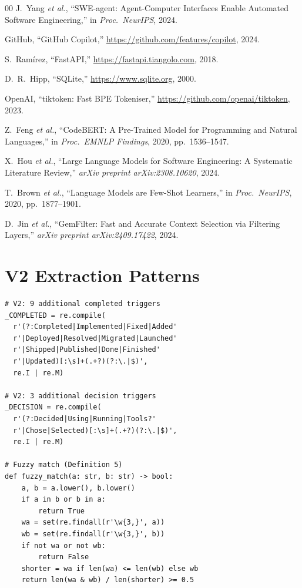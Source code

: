 \documentclass[journal]{IEEEtran}
\begin{document}
\begin{thebibliography}{00}
J.~Yang \emph{et al.}, ``SWE-agent: Agent-Computer Interfaces
Enable Automated Software Engineering,'' in \emph{Proc.\
NeurIPS}, 2024.

GitHub, ``GitHub Copilot,''
\url{https://github.com/features/copilot}, 2024.

S.~Ram\'irez, ``FastAPI,''
\url{https://fastapi.tiangolo.com}, 2018.

D.~R.~Hipp, ``SQLite,''
\url{https://www.sqlite.org}, 2000.

OpenAI, ``tiktoken: Fast BPE Tokeniser,''
\url{https://github.com/openai/tiktoken}, 2023.

Z.~Feng \emph{et al.}, ``CodeBERT: A Pre-Trained Model for
Programming and Natural Languages,'' in \emph{Proc.\ EMNLP
Findings}, 2020, pp.\ 1536--1547.

X.~Hou \emph{et al.}, ``Large Language Models for Software
Engineering: A Systematic Literature Review,''
\emph{arXiv preprint arXiv:2308.10620}, 2024.

T.~Brown \emph{et al.}, ``Language Models are Few-Shot
Learners,'' in \emph{Proc.\ NeurIPS}, 2020,
pp.\ 1877--1901.

D.~Jin \emph{et al.}, ``GemFilter: Fast and Accurate
Context Selection via Filtering Layers,''
\emph{arXiv preprint arXiv:2409.17422}, 2024.

\end{thebibliography}

\appendix

\section{V2 Extraction Patterns}
\label{appendix:regex}

\begin{small}
\begin{verbatim}
# V2: 9 additional completed triggers
_COMPLETED = re.compile(
  r'(?:Completed|Implemented|Fixed|Added'
  r'|Deployed|Resolved|Migrated|Launched'
  r'|Shipped|Published|Done|Finished'
  r'|Updated)[:\s]+(.+?)(?:\.|$)',
  re.I | re.M)

# V2: 3 additional decision triggers
_DECISION = re.compile(
  r'(?:Decided|Using|Running|Tools?'
  r'|Chose|Selected)[:\s]+(.+?)(?:\.|$)',
  re.I | re.M)

# Fuzzy match (Definition 5)
def fuzzy_match(a: str, b: str) -> bool:
    a, b = a.lower(), b.lower()
    if a in b or b in a:
        return True
    wa = set(re.findall(r'\w{3,}', a))
    wb = set(re.findall(r'\w{3,}', b))
    if not wa or not wb:
        return False
    shorter = wa if len(wa) <= len(wb) else wb
    return len(wa & wb) / len(shorter) >= 0.5
\end{verbatim}
\end{small}
\end{document}
